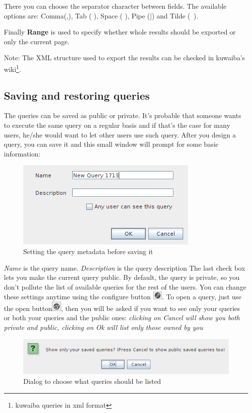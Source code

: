 \documentclass[a4paper]{article}
\begin{document}
	There you can choose the separator character between fields. The available options are: Comma(,), Tab (	), Space ( ), Pipe (|) and Tilde (~).
	
	Finally \textbf{Range} is used to specify whether whole results should be exported or only the current page.
	
	Note: The XML structure used to export the results can be checked in kuwaiba's wiki\footnote{kuwaiba queries in xml format }.
	
	\subsection{Saving and restoring queries}
	The queries can be saved as public or private. It's probable that someone wants to execute the same query on a regular basis and if that's the case for many users, he/she would want to let other users use such query. After you design a query, you can save it and this small window will prompt for some basic information:
	\begin{figure}[h!]
		\centering
		\includegraphics[width=0.5\linewidth]{img/query_save_menu.png}
		\caption{Setting the query metadata before saving it}
		\label{fig:query_save_menu}
	\end{figure}
	
	\textit{Name} is the query name.
	\textit{Description} is the query description
	The last check box lets you make the current query public. By default, the query is private, so you don't pollute the list of available queries for the rest of the users. You can change these settings anytime using the configure button \includegraphics[width=0.5cm]{img/icon_edit_saved_query.png}.
	To open a query, just use the open button\includegraphics[width=0.5cm]{img/icon_open.png}, then you will be asked if you want to see only your queries or both your queries and the public ones:
	\textit{clicking on Cancel will show you both private and public, clicking on Ok will list only those owned by you}
	\begin{figure}[h!]
		\centering
		\includegraphics[width=0.7\linewidth]{img/query_save_as_private.png}
		\caption{Dialog to choose what queries should be listed}
		\label{fig:query_save_as_private}
	\end{figure}
	
\end{document}
